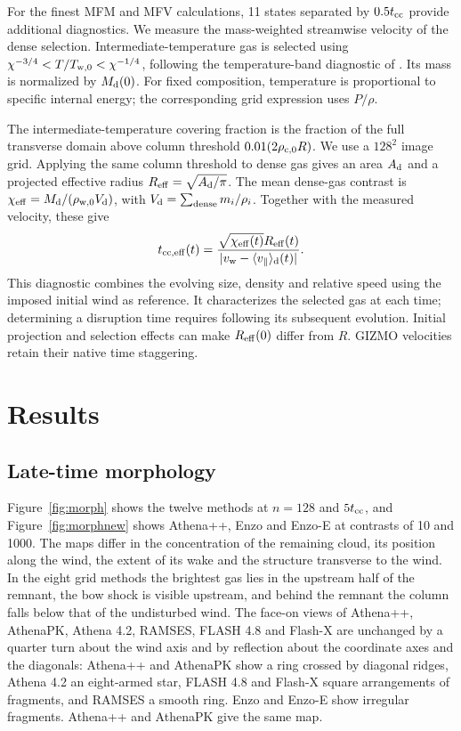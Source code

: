 \documentclass[twocolumn,apj,numberedappendix]{openjournal}
\begin{document}
For the finest MFM and MFV calculations, 11 states separated by $0.5t_{\rm cc}$ provide additional diagnostics. We measure the mass-weighted streamwise velocity of the dense selection. Intermediate-temperature gas is selected using $\chi^{-3/4}<T/T_{\rm w,0}<\chi^{-1/4}$, following the temperature-band diagnostic of \citet{Braspenning2023}. Its mass is normalized by $M_{\rm d}(0)$. For fixed composition, temperature is proportional to specific internal energy; the corresponding grid expression uses $P/\rho$.

The intermediate-temperature covering fraction is the fraction of the full transverse domain above column threshold $0.01(2\rho_{\rm c,0}R)$. We use a $128^2$ image grid. Applying the same column threshold to dense gas gives an area $A_{\rm d}$ and a projected effective radius $R_{\rm eff}=\sqrt{A_{\rm d}/\pi}$. The mean dense-gas contrast is $\chi_{\rm eff}=M_{\rm d}/(\rho_{\rm w,0}V_{\rm d})$, with $V_{\rm d}=\sum_{\rm dense}m_i/\rho_i$. Together with the measured velocity, these give
\begin{equation}
t_{\rm cc,eff}(t)=\frac{\sqrt{\chi_{\rm eff}(t)}R_{\rm eff}(t)}{|v_{\rm w}-\langle v_\parallel\rangle_{\rm d}(t)|}.
\label{eq:effective}
\end{equation}
This diagnostic combines the evolving size, density and relative speed using the imposed initial wind as reference. It characterizes the selected gas at each time; determining a disruption time requires following its subsequent evolution. Initial projection and selection effects can make $R_{\rm eff}(0)$ differ from $R$. GIZMO velocities retain their native time staggering.

\section{Results}\label{sec:results}
\subsection{Late-time morphology}
Figure~\ref{fig:morph} shows the twelve methods at $n=128$ and $5t_{\rm cc}$, and Figure~\ref{fig:morphnew} shows Athena++, Enzo and Enzo-E at contrasts of 10 and 1000. The maps differ in the concentration of the remaining cloud, its position along the wind, the extent of its wake and the structure transverse to the wind. In the eight grid methods the brightest gas lies in the upstream half of the remnant, the bow shock is visible upstream, and behind the remnant the column falls below that of the undisturbed wind. The face-on views of Athena++, AthenaPK, Athena 4.2, RAMSES, FLASH 4.8 and Flash-X are unchanged by a quarter turn about the wind axis and by reflection about the coordinate axes and the diagonals: Athena++ and AthenaPK show a ring crossed by diagonal ridges, Athena 4.2 an eight-armed star, FLASH 4.8 and Flash-X square arrangements of fragments, and RAMSES a smooth ring. Enzo and Enzo-E show irregular fragments. Athena++ and AthenaPK give the same map.
\end{document}
